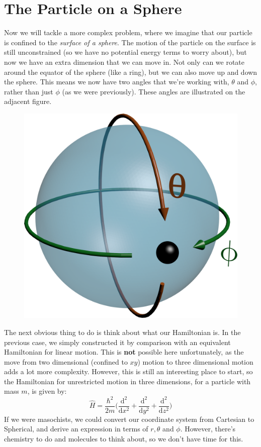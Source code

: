 \documentclass{memoir}[11pt,oneside,a4paper,openany]
\newcommand{\dd}{\ensuremath{\mathrm{d}}}
\begin{document}
\section{The Particle on a Sphere}
Now we will tackle a more complex problem, where we imagine that our particle is confined to the \emph{surface of a sphere}. The motion of the particle on the surface is still unconstrained (so we have no potential energy terms to worry about), but now we have an extra dimension that we can move in. Not only can we rotate around the equator of the sphere (like a ring), but we can also move up and down the sphere. This means we now have two angles that we're working with, $\theta$ and $\phi$, rather than just $\phi$ (as we were previously). These angles are illustrated on the adjacent figure. 
\begin{figure}
	\centering
	\includegraphics[width=\linewidth]{particle_on_sphere}
\end{figure}

The next obvious thing to do is think about what our Hamiltonian is. In the previous case, we simply constructed it by comparison with an equivalent Hamiltonian for linear motion. This is \textbf{not} possible here unfortunately, as the move from two dimensional (confined to $xy$) motion to three dimensional motion adds a lot more complexity. However, this is still an interesting place to start, so the Hamiltonian for unrestricted motion in three dimensions, for a particle with mass $m$, is given by:
\begin{equation}\label{eq:hamiltonian_3d}
	\hat{H} = \frac{\hbar^2}{2m}\bigg(\frac{\dd^2}{\dd x^2} + \frac{\dd^2}{\dd y^2} + \frac{\dd^2}{\dd z^2}\bigg)
\end{equation}
If we were masochists, we could convert our coordinate system from Cartesian to Spherical, and derive an expression in terms of $r, \theta$ and $\phi$. However, there's chemistry to do and molecules to think about, so we don't have time for this. 
\end{document}
